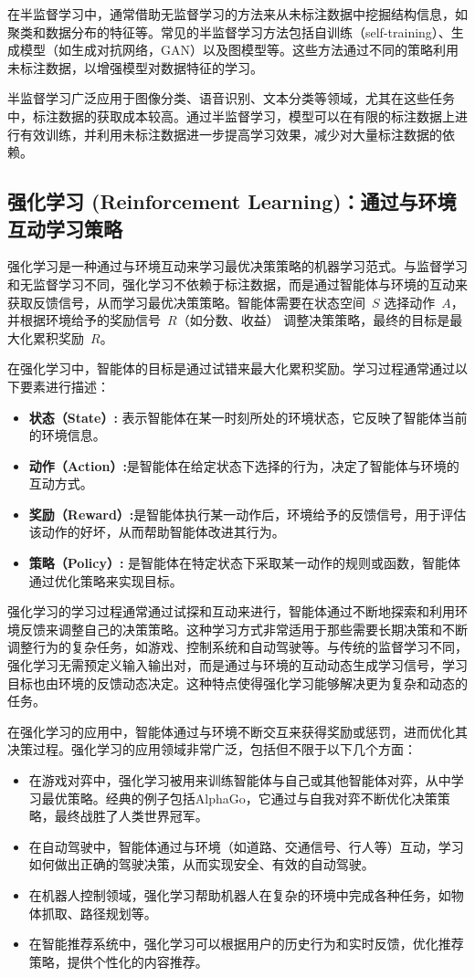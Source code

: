 在半监督学习中，通常借助无监督学习的方法来从未标注数据中挖掘结构信息，如聚类和数据分布的特征等。常见的半监督学习方法包括自训练（self-training）、生成模型（如生成对抗网络，GAN）以及图模型等。这些方法通过不同的策略利用未标注数据，以增强模型对数据特征的学习。

半监督学习广泛应用于图像分类、语音识别、文本分类等领域，尤其在这些任务中，标注数据的获取成本较高。通过半监督学习，模型可以在有限的标注数据上进行有效训练，并利用未标注数据进一步提高学习效果，减少对大量标注数据的依赖。

 
\subsection{强化学习 (Reinforcement Learning)：通过与环境互动学习策略}
强化学习是一种通过与环境互动来学习最优决策策略的机器学习范式。与监督学习和无监督学习不同，强化学习不依赖于标注数据，而是通过智能体与环境的互动来获取反馈信号，从而学习最优决策策略。智能体需要在状态空间~$S$ 选择动作~$A$，并根据环境给予的奖励信号~$R$（如分数、收益） 调整决策策略，最终的目标是最大化累积奖励~$R$。

在强化学习中，智能体的目标是通过试错来最大化累积奖励。学习过程通常通过以下要素进行描述：
\begin{itemize}
\item {\bf 状态（State）:} 表示智能体在某一时刻所处的环境状态，它反映了智能体当前的环境信息。
\item {\bf  动作（Action）:}是智能体在给定状态下选择的行为，决定了智能体与环境的互动方式。
\item {\bf 奖励（Reward）:}是智能体执行某一动作后，环境给予的反馈信号，用于评估该动作的好坏，从而帮助智能体改进其行为。
\item {\bf  策略（Policy）:} 是智能体在特定状态下采取某一动作的规则或函数，智能体通过优化策略来实现目标。
\end{itemize}

强化学习的学习过程通常通过试探和互动来进行，智能体通过不断地探索和利用环境反馈来调整自己的决策策略。这种学习方式非常适用于那些需要长期决策和不断调整行为的复杂任务，如游戏、控制系统和自动驾驶等。与传统的监督学习不同，强化学习无需预定义输入输出对，而是通过与环境的互动动态生成学习信号，学习目标也由环境的反馈动态决定。这种特点使得强化学习能够解决更为复杂和动态的任务。

在强化学习的应用中，智能体通过与环境不断交互来获得奖励或惩罚，进而优化其决策过程。强化学习的应用领域非常广泛，包括但不限于以下几个方面：
\begin{itemize}
\item 在游戏对弈中，强化学习被用来训练智能体与自己或其他智能体对弈，从中学习最优策略。经典的例子包括AlphaGo，它通过与自我对弈不断优化决策策略，最终战胜了人类世界冠军。
\item 在自动驾驶中，智能体通过与环境（如道路、交通信号、行人等）互动，学习如何做出正确的驾驶决策，从而实现安全、有效的自动驾驶。
\item 在机器人控制领域，强化学习帮助机器人在复杂的环境中完成各种任务，如物体抓取、路径规划等。
\item 在智能推荐系统中，强化学习可以根据用户的历史行为和实时反馈，优化推荐策略，提供个性化的内容推荐。
\end{itemize}

